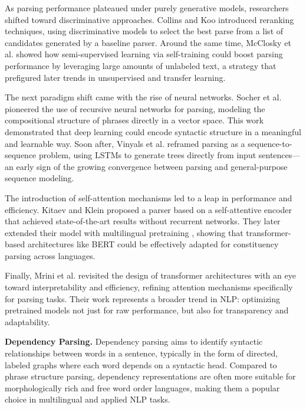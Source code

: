 As parsing performance plateaued under purely generative models, researchers shifted toward discriminative approaches. Collins and Koo \cite{collins2005discriminative} introduced reranking techniques, using discriminative models to select the best parse from a list of candidates generated by a baseline parser. Around the same time, McClosky et al. \cite{mcclosky2006effective} showed how semi-supervised learning via self-training could boost parsing performance by leveraging large amounts of unlabeled text, a strategy that prefigured later trends in unsupervised and transfer learning.

The next paradigm shift came with the rise of neural networks. Socher et al. \cite{socher2013parsing} pioneered the use of recursive neural networks for parsing, modeling the compositional structure of phrases directly in a vector space. This work demonstrated that deep learning could encode syntactic structure in a meaningful and learnable way. Soon after, Vinyals et al. \cite{vinyals2015grammar} reframed parsing as a sequence-to-sequence problem, using LSTMs to generate trees directly from input sentences—an early sign of the growing convergence between parsing and general-purpose sequence modeling.

The introduction of self-attention mechanisms led to a leap in performance and efficiency. Kitaev and Klein \cite{kitaev2018constituency} proposed a parser based on a self-attentive encoder that achieved state-of-the-art results without recurrent networks. They later extended their model with multilingual pretraining \cite{kitaev2019multilingual}, showing that transformer-based architectures like BERT could be effectively adapted for constituency parsing across languages.

Finally, Mrini et al. \cite{mrini2020rethinking} revisited the design of transformer architectures with an eye toward interpretability and efficiency, refining attention mechanisms specifically for parsing tasks. Their work represents a broader trend in NLP: optimizing pretrained models not just for raw performance, but also for transparency and adaptability.

\textbf{Dependency Parsing.} Dependency parsing aims to identify syntactic relationships between words in a sentence, typically in the form of directed, labeled graphs where each word depends on a syntactic head. Compared to phrase structure parsing, dependency representations are often more suitable for morphologically rich and free word order languages, making them a popular choice in multilingual and applied NLP tasks.

